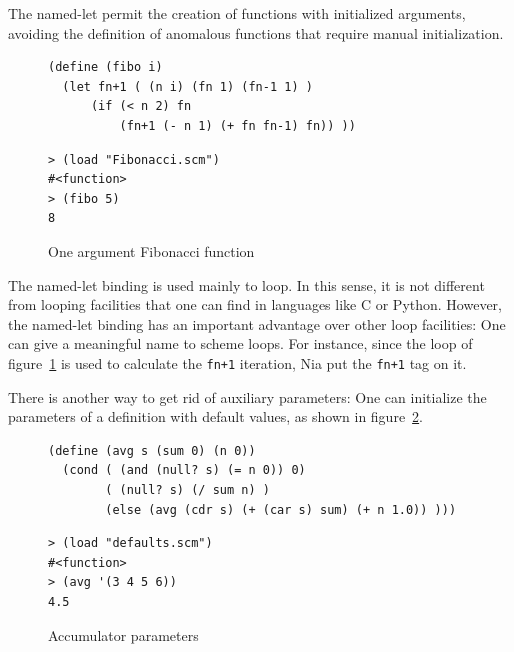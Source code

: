 \documentclass[a4paper,12pt]{book}
\newenvironment{fmpage}[1]
               {\begin{lrbox}{\fmbox}\begin{minipage}{#1}}
               {\end{minipage}\end{lrbox}\fbox{\usebox{\fmbox}}}
\begin{document}
The named-let
permit the creation of functions
with initialized arguments, avoiding
the definition of anomalous functions
that require manual initialization.

\begin{figure}[!h]
\begin{fmpage}{0.9\linewidth}
\begin{verbatim}
(define (fibo i)
  (let fn+1 ( (n i) (fn 1) (fn-1 1) )
      (if (< n 2) fn
          (fn+1 (- n 1) (+ fn fn-1) fn)) ))

\end{verbatim}
\end{fmpage}

\begin{fmpage}{0.9\linewidth}
\begin{verbatim}
> (load "Fibonacci.scm")
#<function>
> (fibo 5)
8
\end{verbatim}
\end{fmpage}
\caption{One argument Fibonacci function}
\label{oneargfib}
\end{figure}

The named-let binding is used mainly
to loop. In this sense, it is not
different from looping facilities
that one can find in languages like C
or Python. However, the named-let
binding has an important advantage
over other loop facilities: One can
give a meaningful name to scheme loops.
For instance, since the loop of
figure~\ref{oneargfib} is used 
to calculate the \verb|fn+1| iteration,
Nia put the \verb|fn+1| tag on it.

There is another way to get rid of
auxiliary parameters:
One can initialize the parameters
of a definition with
default values, as shown
in figure~\ref{accumulators}.


\begin{figure}[!h]
\begin{fmpage}{\linewidth}
\begin{verbatim}
(define (avg s (sum 0) (n 0))
  (cond ( (and (null? s) (= n 0)) 0)
        ( (null? s) (/ sum n) )
        (else (avg (cdr s) (+ (car s) sum) (+ n 1.0)) )))
\end{verbatim}
\end{fmpage}

\begin{fmpage}{\linewidth}
\begin{verbatim}
> (load "defaults.scm")
#<function>
> (avg '(3 4 5 6))
4.5
\end{verbatim}
\end{fmpage}
\caption{Accumulator parameters}
\label{accumulators}
\end{figure}
\end{document}
